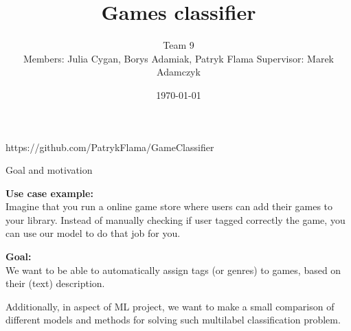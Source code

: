 \documentclass{beamer}
\title{Games classifier}
\author[Team 9]{Team 9\\[5mm]
{\small Members: Julia Cygan, Borys Adamiak, Patryk Flama}
\hspace{18mm} 
{\small Supervisor: Marek Adamczyk}}
\institute{UWr}
\date{\today}
\begin{document}
\begin{frame}
\titlepage
\end{frame}

\begin{frame}
	https://github.com/PatrykFlama/GameClassifier
\end{frame}

\begin{frame}[t]{Goal and motivation}

{\bf Use case example:} \\
Imagine that you run a online game store where users can add their games to your library. Instead of manually checking if user tagged correctly the game, you can use our model to do that job for you. \\

\vspace{3mm}

{\bf Goal:} \\
We want to be able to automatically assign tags (or genres) to games, based on their (text) description.

\vspace{3mm}

Additionally, in aspect of ML project, we want to make a small comparison of different models and methods for solving such multilabel classification problem.
\end{frame}
\end{document}
